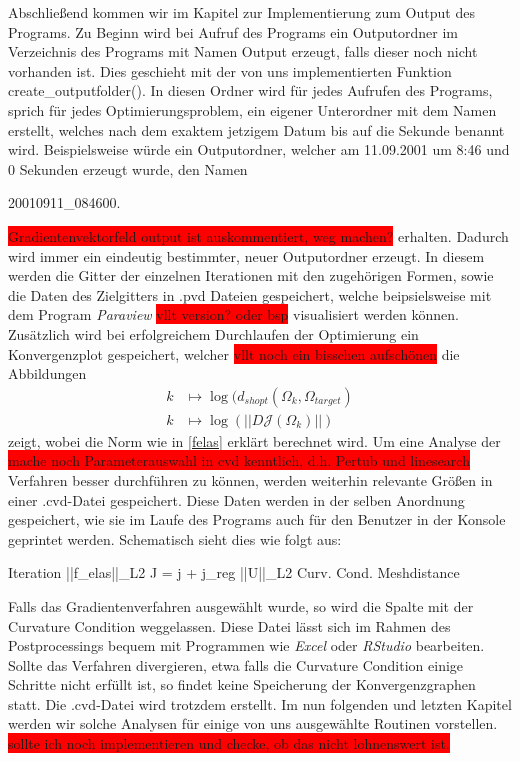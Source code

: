 \documentclass[bibliography=totoc,12pt,a4paper]{scrartcl}
\theoremstyle{exampstyle}
\numberwithin{equation}{section}
\begin{document}
Abschließend kommen wir im Kapitel zur Implementierung zum Output des Programs.
Zu Beginn wird bei Aufruf des Programs ein Outputordner im Verzeichnis des Programs mit Namen \textsf{Output} erzeugt, falls dieser noch nicht vorhanden ist. Dies geschieht mit der von uns implementierten Funktion \textsf{create\_outputfolder()}. In diesen Ordner wird für jedes Aufrufen des Programs, sprich für jedes Optimierungsproblem, ein eigener Unterordner mit dem Namen erstellt, welches nach dem exaktem jetzigem Datum bis auf die Sekunde benannt wird. Beispielsweise würde ein Outputordner, welcher am 11.09.2001 um 8:46 und 0 Sekunden erzeugt wurde, den Namen 
\begin{center}
\textsf{20010911\_084600}.
\end{center}
\colorbox{red}{Gradientenvektorfeld output ist auskommentiert, weg machen?}
erhalten. Dadurch wird immer ein eindeutig bestimmter, neuer Outputordner erzeugt. In diesem werden die Gitter der einzelnen Iterationen mit den zugehörigen Formen, sowie die Daten des Zielgitters in \textsf{.pvd} Dateien gespeichert, welche beipsielsweise mit dem Program \textit{Paraview} \colorbox{red}{vllt version? oder bsp} visualisiert werden können. Zusätzlich wird bei erfolgreichem Durchlaufen der Optimierung ein Konvergenzplot gespeichert, welcher \colorbox{red}{vllt noch ein bisschen aufschönen} die Abbildungen
\begin{align*}
k &\mapsto \log(d_{shopt}(\Omega_k, \Omega_{target}) \\
k &\mapsto \log(\vert\vert D\mathcal{J}(\Omega_k) \vert\vert)
\end{align*}
zeigt, wobei die Norm wie in \ref{felas} erklärt berechnet wird. Um eine Analyse der \colorbox{red}{mache noch Parameterauswahl in cvd kenntlich, d.h. Pertub und linesearch} Verfahren besser durchführen zu können, werden weiterhin relevante Größen in einer \textsf{.cvd}-Datei gespeichert. Diese Daten werden in der selben Anordnung gespeichert, wie sie im Laufe des Programs auch für den Benutzer in der Konsole geprintet werden. Schematisch sieht dies wie folgt aus:
\begin{center}
\textsf{Iteration \hspace{0.1cm}  ||f\_elas||\_L2 \hspace{0.1cm}  J = j + j\_reg   \hspace{0.1cm} ||U||\_L2 \hspace{0.1cm}  Curv. Cond. \hspace{0.1cm} Meshdistance}
\end{center}

Falls das Gradientenverfahren ausgewählt wurde, so wird die Spalte mit der Curvature Condition weggelassen. Diese Datei lässt sich im Rahmen des Postprocessings bequem mit Programmen wie \textit{Excel} oder \textit{RStudio} bearbeiten. Sollte das Verfahren divergieren, etwa falls die Curvature Condition einige Schritte nicht erfüllt ist, so findet keine Speicherung der Konvergenzgraphen statt. Die \textsf{.cvd}-Datei wird trotzdem erstellt. 
Im nun folgenden und letzten Kapitel werden wir solche Analysen für einige von uns ausgewählte Routinen vorstellen.
 \colorbox{red}{sollte ich noch implementieren und checke, ob das nicht lohnenswert ist.}

\newpage
\nocite{*}


\end{document}
